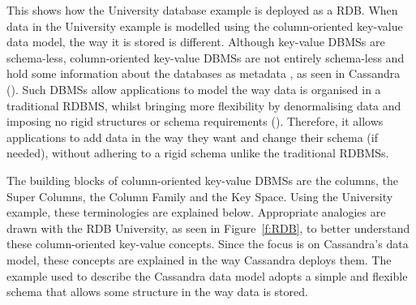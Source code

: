 This shows how the University database example is deployed as a \ac{RDB}.  When
data in the University example is modelled using the column-oriented key-value
data model,   the way it is stored is different.
Although key-value \acp{DBMS} are schema-less,   column-oriented key-value
\acp{DBMS} are not entirely schema-less and hold some information about the
databases as metadata , as seen in Cassandra ().  Such
\acp{DBMS} allow applications to model the way data is organised in a
traditional \ac{RDBMS}, whilst bringing more flexibility by denormalising data
and imposing no rigid structures or schema requirements ().
Therefore,   it allows applications to add data in the way they want and change
their schema (if needed),   without adhering to a rigid schema unlike the
traditional \acp{RDBMS}.

The building blocks of column-oriented key-value \acp{DBMS} are the columns,  
the Super Columns,   the Column Family and the Key Space.  Using the
University example,   these terminologies are explained below. 
Appropriate analogies are drawn with the \ac{RDB} University,   as
seen in Figure~\ref{f:RDB}, to better understand these column-oriented key-value
concepts.  Since the focus is on Cassandra's data model,   these concepts
are explained in the way Cassandra deploys them.  The example used
to describe the Cassandra data model adopts a simple and flexible schema that
allows some structure in the way data is stored. 

